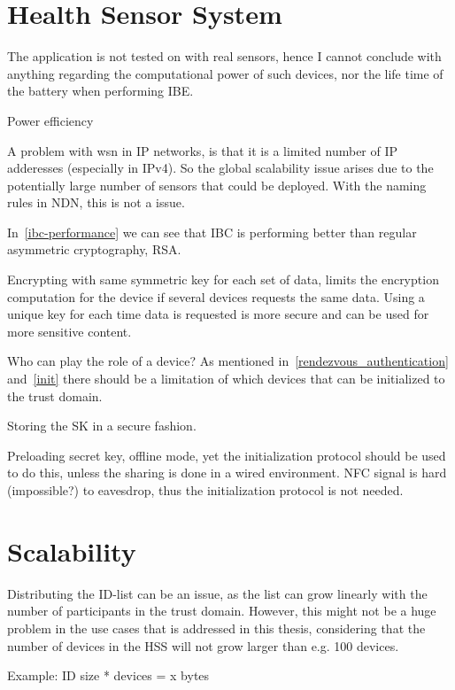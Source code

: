\section{Health Sensor System}
The application is not tested on with real sensors, hence I cannot conclude with anything regarding the computational power of such devices, nor the life time of the battery when performing \gls{IBE}.  

Power efficiency

A problem with \gls{wsn} in \gls{IP} networks, is that it is a limited number of \gls{IP} adderesses (especially in \gls{IPv4}).
So the global scalability issue arises due to the potentially large number of sensors that could be deployed. 
With the naming rules in \gls{NDN}, this is not a issue.

In~\autoref{ibc-performance} we can see that \gls{IBC} is performing better than regular asymmetric cryptography, RSA. 

Encrypting with same symmetric key for each set of \gls{data}, limits the encryption computation for the device if several devices requests the same \gls{data}.
Using a unique key for each time \gls{data} is requested is more secure and can be used for more sensitive content.

Who can play the role of a device?
As mentioned in~\autoref{rendezvous_authentication} and~\autoref{init} there should be a limitation of which devices that can be initialized to the trust domain.

Storing the \gls{SK} in a secure fashion.

Preloading secret key, offline mode, yet the initialization protocol should be used to do this, unless the sharing is done in a wired environment. 
\gls{NFC} signal is hard (impossible?) to eavesdrop, thus the initialization protocol is not needed. 


\section{Scalability}
Distributing the \gls{ID}-list can be an issue, as the list can grow linearly with the number of participants in the trust domain.
However, this might not be a huge problem in the use cases that is addressed in this thesis, considering that the number of devices in the \gls{HSS} will not grow larger than e.g. 100 devices. 

Example:
ID size * devices = x bytes 

